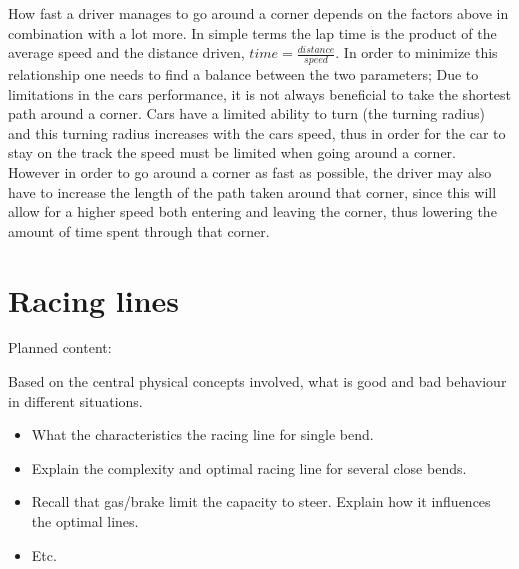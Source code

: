 How fast a driver manages to go around a corner depends on the factors above in combination with a lot more. In simple terms the lap time is the product of the average speed and the distance driven, $time = \frac{distance}{speed}$. In order to minimize this relationship one needs to find a balance between the two parameters; Due to limitations in the cars performance, it is not always beneficial to take the shortest path around a corner. Cars have a limited ability to turn (the turning radius) and this turning radius increases with the cars speed, thus in order for the car to stay on the track the speed must be limited when going around a corner. However in order to go around a corner as fast as possible, the driver may also have to increase the length of the path taken around that corner, since this will allow for a higher speed both entering and leaving the corner, thus lowering the amount of time spent through that corner.

\section{Racing lines}
Planned content:

Based on the central physical concepts involved, what is good and bad behaviour in different situations. 
\begin{itemize}
    \item What the characteristics the racing line for single bend.
    \item Explain the complexity and optimal racing line for several close bends.
    \item Recall that gas/brake limit the capacity to steer. Explain how it influences the optimal lines.
    \item Etc.
\end{itemize}
\fi